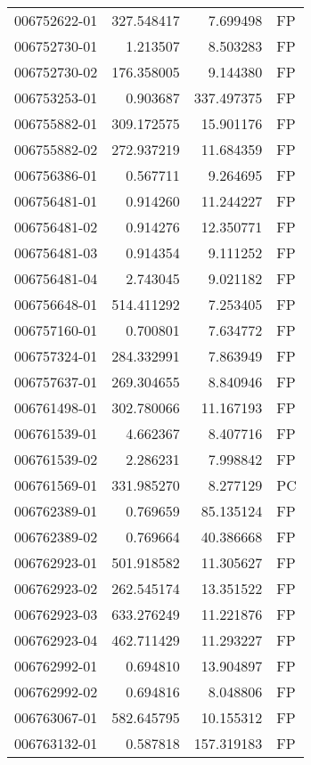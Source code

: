 \begin{tabular}{lrrl}
006752622-01 &  327.548417 &     7.699498 &   FP \\
006752730-01 &    1.213507 &     8.503283 &   FP \\
006752730-02 &  176.358005 &     9.144380 &   FP \\
006753253-01 &    0.903687 &   337.497375 &   FP \\
006755882-01 &  309.172575 &    15.901176 &   FP \\
006755882-02 &  272.937219 &    11.684359 &   FP \\
006756386-01 &    0.567711 &     9.264695 &   FP \\
006756481-01 &    0.914260 &    11.244227 &   FP \\
006756481-02 &    0.914276 &    12.350771 &   FP \\
006756481-03 &    0.914354 &     9.111252 &   FP \\
006756481-04 &    2.743045 &     9.021182 &   FP \\
006756648-01 &  514.411292 &     7.253405 &   FP \\
006757160-01 &    0.700801 &     7.634772 &   FP \\
006757324-01 &  284.332991 &     7.863949 &   FP \\
006757637-01 &  269.304655 &     8.840946 &   FP \\
006761498-01 &  302.780066 &    11.167193 &   FP \\
006761539-01 &    4.662367 &     8.407716 &   FP \\
006761539-02 &    2.286231 &     7.998842 &   FP \\
006761569-01 &  331.985270 &     8.277129 &   PC \\
006762389-01 &    0.769659 &    85.135124 &   FP \\
006762389-02 &    0.769664 &    40.386668 &   FP \\
006762923-01 &  501.918582 &    11.305627 &   FP \\
006762923-02 &  262.545174 &    13.351522 &   FP \\
006762923-03 &  633.276249 &    11.221876 &   FP \\
006762923-04 &  462.711429 &    11.293227 &   FP \\
006762992-01 &    0.694810 &    13.904897 &   FP \\
006762992-02 &    0.694816 &     8.048806 &   FP \\
006763067-01 &  582.645795 &    10.155312 &   FP \\
006763132-01 &    0.587818 &   157.319183 &   FP \\

\end{tabular}
